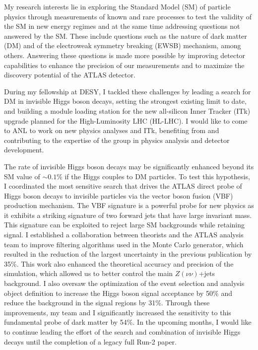 \documentclass[a4paper]{article}
\begin{document}
\thispagestyle{fancy} 
 \lfoot{} \rfoot{\bf \thepage} \cfoot{}

\fontsize{11}{14}
\selectfont


My research interests lie in exploring the Standard Model (SM) of particle physics through measurements of known and rare processes
to test the validity of the SM in new energy regimes and at the same time addressing questions not answered by the SM.
These include questions such as the nature of dark matter (DM) and of the electroweak symmetry breaking (EWSB) mechanism, among others.
Answering these questions is made more possible by improving detector capabilities to enhance the precision of our measurements and to maximize the discovery potential of the ATLAS detector.

During my fellowship at DESY, I tackled these challenges by leading a search for DM in invisible Higgs boson decays, setting the strongest existing limit to date, and building a module loading station for the new all-silicon Inner Tracker (ITk) upgrade planned for the High-Luminosity LHC (HL-LHC). I would like to come to ANL to work on new physics analyses and ITk, benefiting from and contributing to the expertise of the group in physics analysis and detector development.

The rate of invisible Higgs boson decays may be significantly enhanced beyond its SM value of $\sim0.1\%$ if the Higgs couples to DM particles.
To test this hypothesis, I coordinated the most sensitive search that drives the ATLAS direct probe of Higgs boson decays to invisible particles via the vector boson fusion (VBF) production mechanism. The VBF signature is a powerful probe for new physics as it exhibits a striking signature of two forward jets that have large invariant mass. This signature can be exploited to reject large SM backgrounds while retaining signal.
I established a collaboration between theorists and the ATLAS analysis team to improve
filtering algorithms used in the Monte Carlo generator, which resulted in the reduction of the largest uncertainty in the previous publication by 35\%. This work also enhanced the theoretical accuracy and precision of the simulation, which allowed us to better control the main $Z\left(\nu\nu\right)$+jets background.
I also oversaw the optimization of the event selection and analysis object definition to increase the Higgs boson signal acceptance by 50\% and reduce the background in the signal regions by 31\%. Through these improvements, my team and I significantly increased the sensitivity to this fundamental probe of dark matter by 54\%. In the upcoming months, I would like to continue leading the effort of the search and combination of invisible Higgs decays until the completion of a legacy full Run-2 paper.
\end{document}
